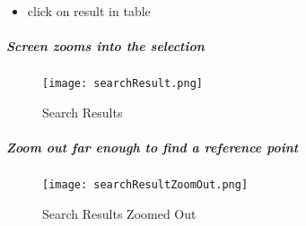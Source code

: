 \begin{itemize}

\item click on result in table

\end{itemize}

\clearpage
\subparagraph*{Screen zooms into the selection}

\begin{figure}[H]
\centering
    \texttt{[image: searchResult.png]}
\vspace{-.1in}

\caption{Search Results}
\end{figure}

\subparagraph*{Zoom out far enough to find a reference point}

\begin{figure}[H]
\centering
    \texttt{[image: searchResultZoomOut.png]}
\vspace{-.1in}

\caption{Search Results Zoomed Out}
\end{figure}
\clearpage


